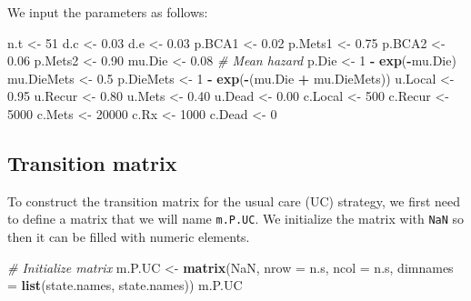 \documentclass[]{article}
\newenvironment{Shaded}{\begin{snugshade}}{\end{snugshade}}
\newcommand{\KeywordTok}[1]{\textcolor[rgb]{0.13,0.29,0.53}{\textbf{#1}}}
\newcommand{\DataTypeTok}[1]{\textcolor[rgb]{0.13,0.29,0.53}{#1}}
\newcommand{\DecValTok}[1]{\textcolor[rgb]{0.00,0.00,0.81}{#1}}
\newcommand{\FloatTok}[1]{\textcolor[rgb]{0.00,0.00,0.81}{#1}}
\newcommand{\StringTok}[1]{\textcolor[rgb]{0.31,0.60,0.02}{#1}}
\newcommand{\CommentTok}[1]{\textcolor[rgb]{0.56,0.35,0.01}{\textit{#1}}}
\newcommand{\OtherTok}[1]{\textcolor[rgb]{0.56,0.35,0.01}{#1}}
\newcommand{\OperatorTok}[1]{\textcolor[rgb]{0.81,0.36,0.00}{\textbf{#1}}}
\newcommand{\NormalTok}[1]{#1}
\theoremstyle{definition}
\theoremstyle{definition}
\theoremstyle{definition}
\theoremstyle{remark}
\begin{document}
We input the parameters as follows:

\begin{Shaded}
\begin{Highlighting}[]
\NormalTok{n.t        <-}\StringTok{ }\DecValTok{51}
\NormalTok{d.c        <-}\StringTok{ }\FloatTok{0.03}
\NormalTok{d.e        <-}\StringTok{ }\FloatTok{0.03}
\NormalTok{p.BCA1     <-}\StringTok{ }\FloatTok{0.02}
\NormalTok{p.Mets1    <-}\StringTok{ }\FloatTok{0.75}
\NormalTok{p.BCA2     <-}\StringTok{ }\FloatTok{0.06}
\NormalTok{p.Mets2    <-}\StringTok{ }\FloatTok{0.90}
\NormalTok{mu.Die     <-}\StringTok{ }\FloatTok{0.08} \CommentTok{# Mean hazard}
\NormalTok{p.Die      <-}\StringTok{ }\DecValTok{1} \OperatorTok{-}\StringTok{ }\KeywordTok{exp}\NormalTok{(}\OperatorTok{-}\NormalTok{mu.Die)}
\NormalTok{mu.DieMets <-}\StringTok{ }\FloatTok{0.5}
\NormalTok{p.DieMets  <-}\StringTok{ }\DecValTok{1} \OperatorTok{-}\StringTok{ }\KeywordTok{exp}\NormalTok{(}\OperatorTok{-}\NormalTok{(mu.Die }\OperatorTok{+}\StringTok{ }\NormalTok{mu.DieMets))}
\NormalTok{u.Local    <-}\StringTok{ }\FloatTok{0.95}
\NormalTok{u.Recur    <-}\StringTok{ }\FloatTok{0.80}
\NormalTok{u.Mets     <-}\StringTok{ }\FloatTok{0.40}
\NormalTok{u.Dead     <-}\StringTok{ }\FloatTok{0.00}
\NormalTok{c.Local    <-}\StringTok{ }\DecValTok{500}
\NormalTok{c.Recur    <-}\StringTok{ }\DecValTok{5000}
\NormalTok{c.Mets     <-}\StringTok{ }\DecValTok{20000}
\NormalTok{c.Rx       <-}\StringTok{ }\DecValTok{1000}
\NormalTok{c.Dead     <-}\StringTok{ }\DecValTok{0}
\end{Highlighting}
\end{Shaded}

\subsection{Transition matrix}\label{transition-matrix}

To construct the transition matrix for the usual care (UC) strategy, we
first need to define a matrix that we will name \texttt{m.P.UC}. We
initialize the matrix with \texttt{NaN} so then it can be filled with
numeric elements.

\begin{Shaded}
\begin{Highlighting}[]
\CommentTok{# Initialize matrix}
\NormalTok{m.P.UC <-}\StringTok{ }\KeywordTok{matrix}\NormalTok{(}\OtherTok{NaN}\NormalTok{, }
                 \DataTypeTok{nrow =}\NormalTok{ n.s, }\DataTypeTok{ncol =}\NormalTok{ n.s, }
                 \DataTypeTok{dimnames =} \KeywordTok{list}\NormalTok{(state.names, state.names))}
\NormalTok{m.P.UC}
\end{Highlighting}
\end{Shaded}
\end{document}
